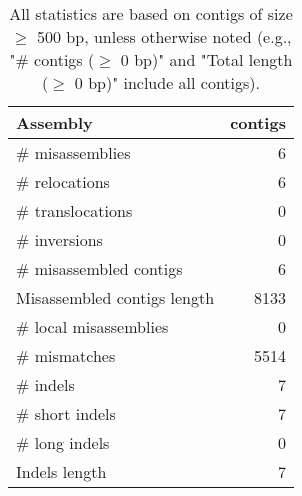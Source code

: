 \documentclass[12pt,a4paper]{article}
\begin{document}
\begin{table}[ht]
\begin{center}
\caption{All statistics are based on contigs of size $\geq$ 500 bp, unless otherwise noted (e.g., "\# contigs ($\geq$ 0 bp)" and "Total length ($\geq$ 0 bp)" include all contigs).}
\begin{tabular}{|l*{1}{|r}|}
\hline
Assembly & contigs \\ \hline
\# misassemblies & 6 \\ \hline
\hspace{5mm}\# relocations & 6 \\ \hline
\hspace{5mm}\# translocations & 0 \\ \hline
\hspace{5mm}\# inversions & 0 \\ \hline
\# misassembled contigs & 6 \\ \hline
Misassembled contigs length & 8133 \\ \hline
\# local misassemblies & 0 \\ \hline
\# mismatches & 5514 \\ \hline
\# indels & 7 \\ \hline
\hspace{5mm}\# short indels & 7 \\ \hline
\hspace{5mm}\# long indels & 0 \\ \hline
Indels length & 7 \\ \hline
\end{tabular}
\end{center}
\end{table}
\end{document}
